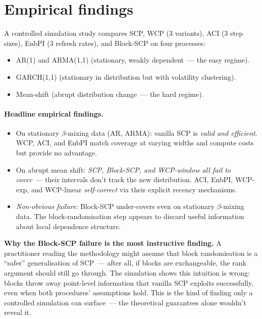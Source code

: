 \documentclass[letterpaper,11pt,leqno]{article}
\begin{document}
\section{Empirical findings}\label{s:empirics}

A controlled simulation study compares SCP, WCP (3 variants), ACI (3 step sizes), EnbPI (3 refresh rates), and Block-SCP on four processes:
\begin{itemize}
\item AR(1) and ARMA(1,1) (stationary, weakly dependent~--- the easy regime).
\item GARCH(1,1) (stationary in distribution but with volatility clustering).
\item Mean-shift (abrupt distribution change~--- the hard regime).
\end{itemize}

\paragraph{Headline empirical findings.}

\begin{itemize}
\item On stationary $\beta$-mixing data (AR, ARMA): vanilla SCP is \emph{valid and efficient}. WCP, ACI, and EnbPI match coverage at varying widths and compute costs but provide no advantage.
\item On abrupt mean shift: \emph{SCP, Block-SCP, and WCP-window all fail to cover}~--- their intervals don't track the new distribution. ACI, EnbPI, WCP-exp, and WCP-linear \emph{self-correct} via their explicit recency mechanisms.
\item \emph{Non-obvious failure}: Block-SCP under-covers even on stationary $\beta$-mixing data. The block-randomisation step appears to discard useful information about local dependence structure.
\end{itemize}

\begin{whymatters}
\textbf{Why the Block-SCP failure is the most instructive finding.} A practitioner reading the methodology might assume that block randomisation is a ``safer'' generalisation of SCP~--- after all, if blocks are exchangeable, the rank argument should still go through. The simulation shows this intuition is wrong: blocks throw away point-level information that vanilla SCP exploits successfully, even when both procedures' assumptions hold. This is the kind of finding only a controlled simulation can surface~--- the theoretical guarantees alone wouldn't reveal it.
\end{whymatters}
\end{document}
